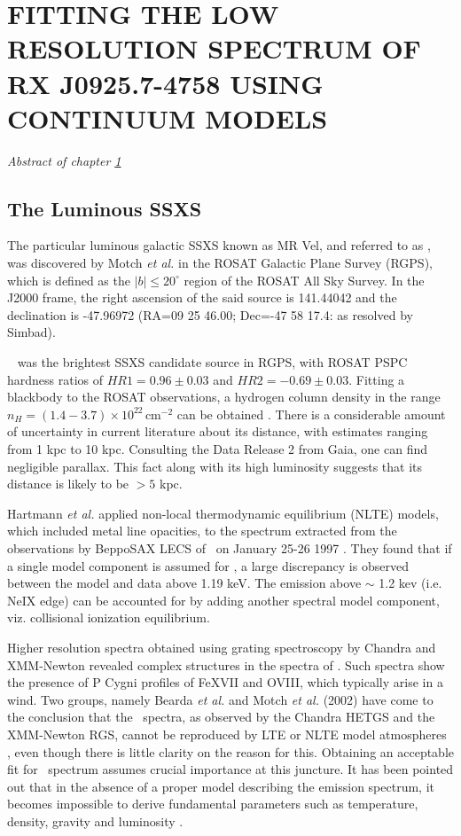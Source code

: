 \chapter{FITTING THE LOW RESOLUTION SPECTRUM OF RX J0925.7-4758 USING CONTINUUM MODELS} \label{chap:continuum}
    \minitoc
    \emph{Abstract of chapter \ref{chap:continuum}}
    
    \section{The Luminous SSXS \mrvel} \label{continuum:on-mrvel}
		The particular luminous galactic SSXS known as MR Vel, and referred to as \mrvel, was discovered by Motch \emph{et al.} \cite{motch1994} in the ROSAT Galactic Plane Survey (RGPS), which is defined as the $|b|\le 20^{\circ}$ region of the ROSAT All Sky Survey. In the J2000 frame, the right ascension of the said source is 141.44042 and the declination is -47.96972 (RA=09 25 46.00; Dec=-47 58 17.4: as resolved by Simbad).
		
		\mrvel~ was the brightest SSXS candidate source in RGPS, with ROSAT PSPC hardness ratios of $HR1=0.96\pm 0.03$ and $HR2=-0.69\pm 0.03$. Fitting a blackbody to the ROSAT observations, a hydrogen column density in the range $n_H=(1.4-3.7)\times 10^{22}\,\mathrm{cm}^{-2}$ can be obtained \cite{motch1994}. There is a considerable amount of uncertainty in current literature about its distance, with estimates ranging from  1 kpc to 10 kpc. Consulting the Data Release 2 from Gaia, one can find negligible parallax. This fact along with its high luminosity suggests that its distance is likely to be $>5$ kpc.
		
		Hartmann \emph{et al.} applied non-local thermodynamic equilibrium (NLTE) models, which included metal line opacities, to the spectrum extracted from the observations by BeppoSAX LECS of \mrvel~on January 25-26 1997 \cite{hartmann99}. They found that if a single model component is assumed for \mrvel, a large discrepancy is observed between the model and data above 1.19 keV. The emission above $\sim$ 1.2 kev (i.e. NeIX edge) can be accounted for by adding another spectral model component, viz. collisional ionization equilibrium.
		
		Higher resolution spectra obtained using grating spectroscopy by Chandra and XMM-Newton revealed complex structures in the spectra of \mrvel. Such spectra show the presence of P Cygni profiles of FeXVII and OVIII, which typically arise in a wind. Two groups, namely Bearda \emph{et al.} and Motch \emph{et al.} (2002) have come to the conclusion that the \mrvel~spectra, as observed by the Chandra HETGS and the XMM-Newton RGS, cannot be reproduced by LTE or NLTE model atmospheres \cite{bearda2002,motch2002}, even though there is little clarity on the reason for this. Obtaining an acceptable fit for \mrvel~spectrum assumes crucial importance at this juncture. It has been pointed out that in the absence of a proper model describing the emission spectrum, it becomes impossible to derive fundamental parameters such as temperature, density, gravity and luminosity \cite{motch2002}.
		
